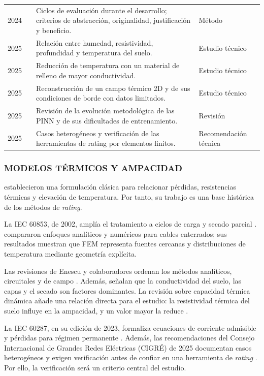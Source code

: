 \documentclass[11pt,a4paper,oneside]{report}
\begin{document}
\begin{longtable}{L{1.1cm}L{3.4cm}L{7.6cm}L{2.4cm}}
2024 & \textcite{delport2024} & Ciclos de evaluación durante el desarrollo; criterios de abstracción, originalidad, justificación y beneficio. & Método \\
2025 & \textcite{khumalo2025} & Relación entre humedad, resistividad, profundidad y temperatura del suelo. & Estudio técnico \\
2025 & \textcite{kim2025} & Reducción de temperatura con un material de relleno de mayor conductividad. & Estudio técnico \\
2025 & \textcite{pan2025} & Reconstrucción de un campo térmico 2D y de sus condiciones de borde con datos limitados. & Estudio técnico \\
2025 & \textcite{ren2025} & Revisión de la evolución metodológica de las PINN y de sus dificultades de entrenamiento. & Revisión \\
2025 & \textcite{cigre2025} & Casos heterogéneos y verificación de las herramientas de rating por elementos finitos. & Recomendación técnica \\
\bottomrule
\end{longtable}\endgroup

\subsubsection{MODELOS TÉRMICOS Y AMPACIDAD}

\textcite[752--772]{neher1957} establecieron una formulación clásica para relacionar pérdidas, resistencias térmicas y elevación de temperatura. Por tanto, su trabajo es una base histórica de los métodos de \textit{rating}.

La IEC 60853, de 2002, amplía el tratamiento a ciclos de carga y secado parcial \parencite[cláusulas 2--4]{iec60853}. \textcite[1387--1400]{aras2005} compararon enfoques analíticos y numéricos para cables enterrados; sus resultados muestran que FEM representa fuentes cercanas y distribuciones de temperatura mediante geometría explícita.

Las revisiones de Enescu y colaboradores ordenan los métodos analíticos, circuitales y de campo \parencite[4,11,17]{enescu2020}. Además, señalan que la conductividad del suelo, las capas y el secado son factores dominantes. La revisión sobre capacidad térmica dinámica añade una relación directa para el estudio: la resistividad térmica del suelo influye en la ampacidad, y un valor mayor la reduce \parencite[3--6]{enescu2021}.

La IEC 60287, en su edición de 2023, formaliza ecuaciones de corriente admisible y pérdidas para régimen permanente \parencite[cláusulas 4--5]{iec60287}. Además, las recomendaciones del Consejo Internacional de Grandes Redes Eléctricas (CIGRÉ) de 2025 documentan casos heterogéneos y exigen verificación antes de confiar en una herramienta de \textit{rating} \parencite[3--4,41--42,93--99]{cigre2025}. Por ello, la verificación será un criterio central del estudio.
\end{document}
